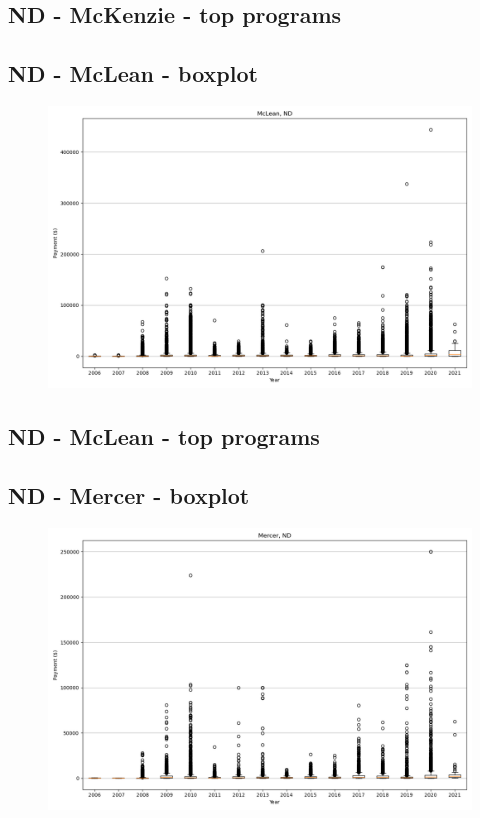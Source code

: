 \subsection*{ND - McKenzie - top programs}

\newpage
\subsection*{ND - McLean - boxplot}
\begin{figure}[h]
\centering
\includegraphics[width=7in]{../output/boxplots/counties/McLean-ND_boxplot.png}
\end{figure}


\subsection*{ND - McLean - top programs}

\newpage
\subsection*{ND - Mercer - boxplot}
\begin{figure}[h]
\centering
\includegraphics[width=7in]{../output/boxplots/counties/Mercer-ND_boxplot.png}
\end{figure}


